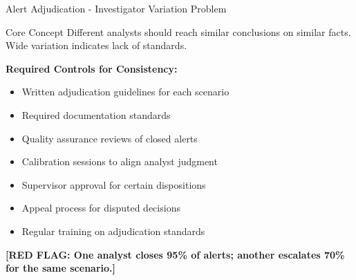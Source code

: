 \documentclass[11pt,a4paper]{beamer}
\newcommand{\redflag}[1]{\textcolor{red!80!black}{\textbf{[RED FLAG: #1]}}}
\begin{document}
	\begin{frame}{Alert Adjudication - Investigator Variation Problem}
		\begin{block}{Core Concept}
			Different analysts should reach similar conclusions on similar facts. Wide variation indicates lack of standards.
		\end{block}
		\textbf{Required Controls for Consistency:}
		\begin{itemize}
			\item Written adjudication guidelines for each scenario
			\item Required documentation standards
			\item Quality assurance reviews of closed alerts
			\item Calibration sessions to align analyst judgment
			\item Supervisor approval for certain dispositions
			\item Appeal process for disputed decisions
			\item Regular training on adjudication standards
		\end{itemize}
		\redflag{One analyst closes 95\% of alerts; another escalates 70\% for the same scenario.}
	\end{frame}
	
\end{document}
